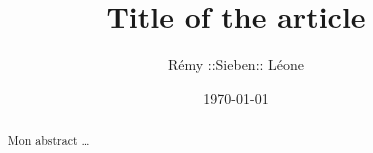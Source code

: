 \title{Title of the article} 
\author{Rémy ::Sieben:: Léone} 
\date{\today}

\maketitle

\begin{abstract}
Mon abstract \ldots
\end{abstract}
